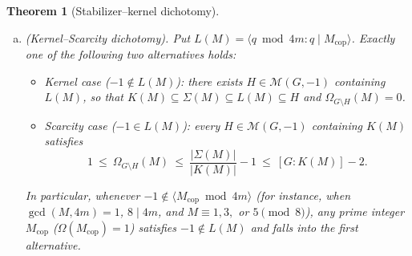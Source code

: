 \documentclass[11pt, a4paper]{article}
\theoremstyle{plain}
\newtheorem{theorem}{Theorem}[section]
\theoremstyle{definition}
\begin{document}
\begin{theorem}[Stabilizer--kernel dichotomy]
\begin{enumerate}[(a)]
\begin{equation}
\begin{split}
    \end{split}
    \end{equation}
    In the specialization $m=ua$ and $M=an+u$, if in addition $\gcd(n,4ua)=1$, $-n\notin\Sigma(M)$, and $n\bmod 4ua\notin K(M)$, then $(-1)K(M)$ and $(-n)K(M)$ are two distinct cosets disjoint from $\Sigma(M)$, improving the upper bound to $[G:K(M)]-3$.
    \item \emph{(Kernel--Scarcity dichotomy).} Put $L(M)=\langle q\bmod 4m:q\mid M_{\mathrm{cop}}\rangle$. Exactly one of the following two alternatives holds:
    \begin{itemize}
        \item \emph{Kernel case ($-1\notin L(M)$):} there exists $H\in\mathcal{M}(G,-1)$ containing $L(M)$, so that $K(M)\subseteq\Sigma(M)\subseteq L(M)\subseteq H$ and $\Omega_{G\setminus H}(M)=0$.
        \item \emph{Scarcity case ($-1\in L(M)$):} every $H\in\mathcal{M}(G,-1)$ containing $K(M)$ satisfies
        \[
        1\ \le\ \Omega_{G\setminus H}(M)\ \le\ \frac{|\Sigma(M)|}{|K(M)|}-1\ \le\ [G:K(M)]-2.
        \]
    \end{itemize}
    In particular, whenever $-1\notin\langle M_{\mathrm{cop}}\bmod 4m\rangle$ (for instance, when $\gcd(M,4m)=1$, $8\mid 4m$, and $M\equiv 1,3,$ or $5\pmod 8$), any prime integer $M_{\mathrm{cop}}$ ($\Omega(M_{\mathrm{cop}})=1$) satisfies $-1\notin L(M)$ and falls into the first alternative.
\end{enumerate}
\end{theorem}
\end{document}
